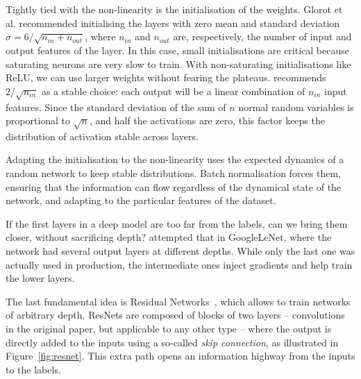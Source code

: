 Tightly tied  with the non-linearity is the initialisation of the weights.
Glorot et al. recommended initialising the layers with zero mean and standard deviation $\sigma=6/\sqrt{n_{in}+ n_{out}}$, where $n_{in}$ and $n_{out}$ are, respectively, the number of input and output features of the layer.
In this case, small initialisations are critical because saturating neurons are very slow to train.
With non-saturating initialisations like ReLU, we can use larger weights without fearing the plateaus.
\citet{he} recommends $2/\sqrt{n_{in}}$ as a stable choice: each output will be a linear combination of $n_{in}$ input features.
Since the standard deviation of the sum of $n$ normal random variables is proportional to $\sqrt{n}$, and half the activations are zero, this factor keeps the distribution of activation stable across layers.

Adapting the initialisation to the non-linearity uses the expected dynamics of a random network to keep stable distributions. 
Batch normalisation forces them, ensuring that the information can flow regardless of the dynamical state of the network, and adapting to the particular features of the dataset.

If the first layers in a deep model are too far from the labels, can we bring them closer, without sacrificing depth?  
\citet{googlenet} attempted that in GoogleLeNet, where the network had several output layers at different depths.
While only the last one was actually used in production, the intermediate ones inject gradients and help train the lower layers.

The last fundamental idea is Residual Networks~\citep{resnet}, which allows to train networks of arbitrary depth. 
ResNets are composed of blocks of two layers  -- convolutions in the original paper, but applicable to any other type -- where the output is directly added to the inputs using a so-called \emph{skip connection}, as illustrated in Figure~\ref{fig:resnet}.
This extra path opens an information highway from the inputs to the labels.

